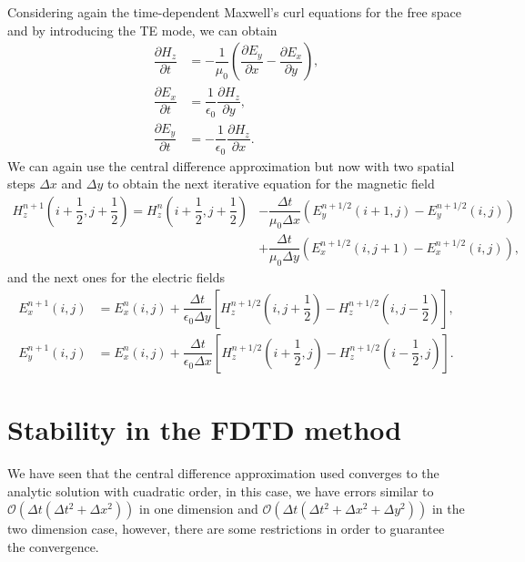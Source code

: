 \documentclass[12pt, oneside]{book}
\begin{document}
\indent Considering again the time-dependent Maxwell's curl equations for the free space and by introducing the TE mode, we can obtain
\begin{align}
    \dfrac{\partial H_z}{\partial t} &= -\dfrac{1}{\mu_0} \left( \dfrac{\partial E_y}{\partial x} - \dfrac{\partial E_x}{\partial y} \right), \\
    \dfrac{\partial E_x}{\partial t} &= \dfrac{1}{\epsilon_0} \dfrac{\partial H_z}{\partial y}, \\
    \dfrac{\partial E_y}{\partial t} &= -\dfrac{1}{\epsilon_0} \dfrac{\partial H_z}{\partial x}. 
\end{align}
We can again use the central difference approximation but now with two spatial steps $\Delta x$ and $\Delta y$ to obtain the next iterative equation for the magnetic field
\begin{equation}
\begin{aligned}
    H_z^{n + 1}\left( i + \dfrac{1}{2},j + \dfrac{1}{2} \right) = H_z^{n}\left( i + \dfrac{1}{2},j + \dfrac{1}{2} \right) &- \dfrac{\Delta t}{\mu_0 \Delta x}\left( E_y^{n + 1/2}(i+1,j) - E_y^{n + 1/2}(i,j) \right) \\
                                                                                                                          &+ \dfrac{\Delta t}{\mu_0 \Delta y}\left( E_x^{n + 1/2}(i,j+1) - E_x^{n + 1/2}(i,j) \right),
\end{aligned}
\label{eq:FDTDMagneticField2D}
\end{equation}
and the next ones for the electric fields
\begin{align}
    E_x^{n+1}(i, j) &= E_x^{n}(i, j) + \dfrac{\Delta t}{\epsilon_0 \Delta y}\left[ H_z^{n+1/2}\left( i,j + \dfrac{1}{2} \right) - H_z^{n+1/2}\left( i,j - \dfrac{1}{2} \right) \right], \\
    E_y^{n+1}(i, j) &= E_x^{n}(i, j) + \dfrac{\Delta t}{\epsilon_0 \Delta x}\left[ H_z^{n+1/2}\left( i + \dfrac{1}{2},j \right) - H_z^{n+1/2}\left( i - \dfrac{1}{2},j \right) \right].
\end{align}

\section{Stability in the FDTD method}

We have seen that the central difference approximation used converges to the analytic solution with cuadratic order, in this case, we have errors similar to $\mathcal{O}(\Delta t(\Delta t^2 + \Delta x^2))$ in one dimension and $\mathcal{O}(\Delta t(\Delta t^2 + \Delta x^2 + \Delta y^2))$ in the two dimension case, however, there are some restrictions in order to guarantee the convergence.
\end{document}
